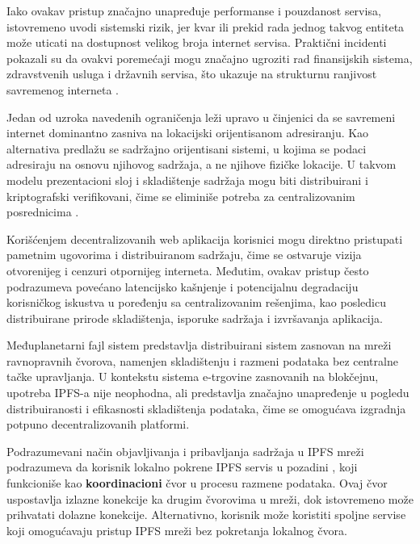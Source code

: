 Iako ovakav pristup značajno unapređuje performanse i pouzdanost servisa, istovremeno uvodi sistemski rizik, jer kvar ili prekid rada jednog takvog entiteta može uticati na dostupnost velikog broja internet servisa. Praktični incidenti pokazali su da ovakvi poremećaji mogu značajno ugroziti rad finansijskih sistema, zdravstvenih usluga i državnih servisa, što ukazuje na strukturnu ranjivost savremenog interneta \cite{youvan2025internet}.

Jedan od uzroka navedenih ograničenja leži upravo u činjenici da se savremeni internet dominantno zasniva na lokacijski orijentisanom adresiranju. Kao alternativa predlažu se sadržajno orijentisani sistemi, u kojima se podaci adresiraju na osnovu njihovog sadržaja, a ne njihove fizičke lokacije. U takvom modelu prezentacioni sloj i skladištenje sadržaja mogu biti distribuirani i kriptografski verifikovani, čime se eliminiše potreba za centralizovanim posrednicima \cite{olofsson2022decentralized}.

Korišćenjem decentralizovanih web aplikacija korisnici mogu direktno pristupati pametnim ugovorima i distribuiranom sadržaju, čime se ostvaruje vizija otvorenijeg i cenzuri otpornijeg interneta. Međutim, ovakav pristup često podrazumeva povećano latencijsko kašnjenje i potencijalnu degradaciju korisničkog iskustva u poređenju sa centralizovanim rešenjima, kao posledicu distribuirane prirode skladištenja, isporuke sadržaja i izvršavanja aplikacija.

Međuplanetarni fajl sistem  \cite{benet2014ipfs} predstavlja distribuirani sistem zasnovan na mreži ravnopravnih čvorova, namenjen skladištenju i razmeni podataka bez centralne tačke upravljanja. U kontekstu sistema e-trgovine zasnovanih na blokčejnu, upotreba IPFS-a nije neophodna, ali predstavlja značajno unapređenje u pogledu distribuiranosti i efikasnosti skladištenja podataka, čime se omogućava izgradnja potpuno decentralizovanih platformi.

Podrazumevani način objavljivanja i pribavljanja sadržaja u IPFS mreži podrazumeva da korisnik lokalno pokrene IPFS servis u pozadini , koji funkcioniše kao \textbf{koordinacioni} čvor u procesu razmene podataka. Ovaj čvor uspostavlja izlazne  konekcije ka drugim čvorovima u mreži, dok istovremeno može prihvatati dolazne  konekcije. Alternativno, korisnik može koristiti spoljne servise koji omogućavaju pristup IPFS mreži bez pokretanja lokalnog čvora.

